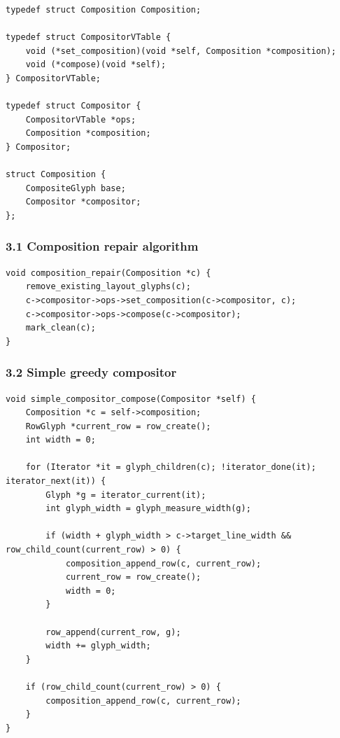 \documentclass[11pt]{article}
\begin{document}
\begin{verbatim}
typedef struct Composition Composition;

typedef struct CompositorVTable {
    void (*set_composition)(void *self, Composition *composition);
    void (*compose)(void *self);
} CompositorVTable;

typedef struct Compositor {
    CompositorVTable *ops;
    Composition *composition;
} Compositor;

struct Composition {
    CompositeGlyph base;
    Compositor *compositor;
};
\end{verbatim}

\subsubsection{3.1 Composition repair algorithm}\label{composition-repair-algorithm}

\begin{verbatim}
void composition_repair(Composition *c) {
    remove_existing_layout_glyphs(c);
    c->compositor->ops->set_composition(c->compositor, c);
    c->compositor->ops->compose(c->compositor);
    mark_clean(c);
}
\end{verbatim}

\subsubsection{3.2 Simple greedy compositor}\label{simple-greedy-compositor}

\begin{verbatim}
void simple_compositor_compose(Compositor *self) {
    Composition *c = self->composition;
    RowGlyph *current_row = row_create();
    int width = 0;

    for (Iterator *it = glyph_children(c); !iterator_done(it); iterator_next(it)) {
        Glyph *g = iterator_current(it);
        int glyph_width = glyph_measure_width(g);

        if (width + glyph_width > c->target_line_width && row_child_count(current_row) > 0) {
            composition_append_row(c, current_row);
            current_row = row_create();
            width = 0;
        }

        row_append(current_row, g);
        width += glyph_width;
    }

    if (row_child_count(current_row) > 0) {
        composition_append_row(c, current_row);
    }
}
\end{verbatim}
\end{document}
